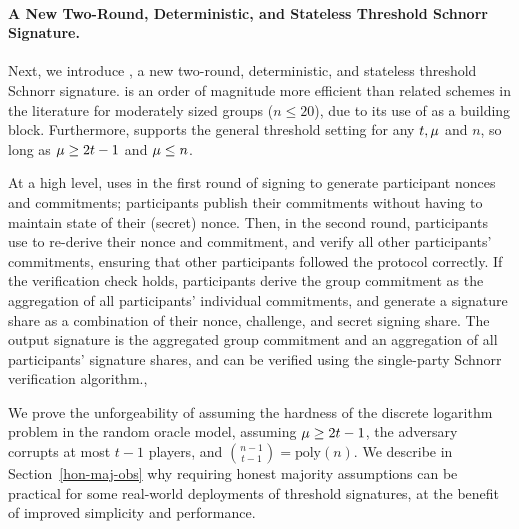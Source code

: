 \paragraph{\bf A New Two-Round, Deterministic, and Stateless Threshold Schnorr Signature.}
Next,
we introduce \glitter,
a new two-round, deterministic, and stateless threshold Schnorr signature.
\glitter is an order of magnitude more efficient than related schemes in the literature for moderately sized groups ($n \le 20$),
due to its use of \DVRFOne as a building block.
Furthermore,
\glitter supports the general threshold setting for any $t, \mu$ and $n$,
so long as $\mu \geq 2t-1$ and $\mu \leq n$.

At a high level,
\glitter uses \DVRFOne in the first round of signing to generate participant nonces and commitments;
participants publish their commitments without having to maintain state of their (secret) nonce.
Then, in the second round,
participants use \DVRFOne to re-derive their nonce and commitment,
and verify all other participants' commitments,
ensuring that other participants followed the protocol correctly.
If the verification check holds,
participants derive the group commitment as the aggregation of all participants' individual commitments,
and generate a signature share as a combination of their nonce, challenge, and secret signing share.
The output signature is the aggregated group commitment and an aggregation of all participants' signature shares,
and can be verified using the single-party Schnorr verification algorithm.,

We prove the unforgeability of \glitter assuming the hardness of the discrete logarithm problem in the random oracle model,
assuming $\mu \geq 2t-1$,
the adversary corrupts at most $t-1$ players,
and ${n-1\choose t-1} = \text{poly}(n)$.
We describe in Section~\ref{hon-maj-obs} why requiring honest majority assumptions can be practical for some real-world deployments of threshold signatures,
at the benefit of improved simplicity and performance.

